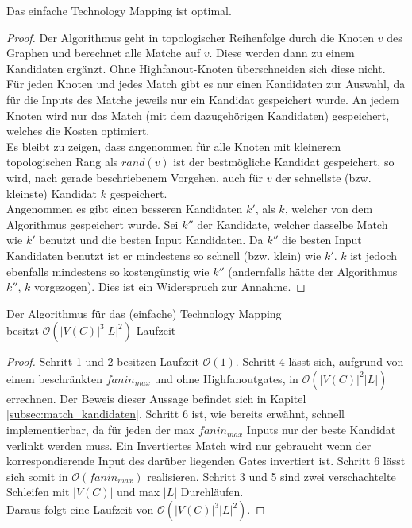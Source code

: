 \documentclass[11pt, a4paper, german]{article}
\newcommand{\TM}{Technology Mapping }
\begin{document}
\begin{cor}
	Das einfache \TM  ist optimal. 
\end{cor}
\begin{proof}
	Der Algorithmus geht in topologischer Reihenfolge durch die Knoten $v$ des Graphen und berechnet alle Matche auf $v$. Diese werden dann zu einem Kandidaten ergänzt. 
 Ohne Highfanout-Knoten überschneiden sich diese nicht. Für jeden Knoten und jedes Match gibt es nur einen Kandidaten zur Auswahl, da für die Inputs des Matche jeweils nur ein Kandidat gespeichert wurde. An jedem Knoten wird nur das Match (mit dem dazugehörigen Kandidaten) gespeichert, welches die Kosten optimiert. \\
 Es bleibt zu zeigen, dass angenommen für alle Knoten mit kleinerem topologischen Rang als $rand(v)$ ist der bestmögliche Kandidat gespeichert, so wird, nach gerade beschriebenem Vorgehen, auch für $v$ der schnellste (bzw. kleinste) Kandidat $k$ gespeichert. \\
 Angenommen es gibt einen besseren Kandidaten $k'$, als $k$, welcher von dem Algorithmus gespeichert wurde. Sei $k''$ der Kandidate, welcher dasselbe Match wie $k'$ benutzt und die besten Input Kandidaten. Da $k''$ die besten Input Kandidaten benutzt ist er mindestens so schnell (bzw. klein) wie $k'$. $k$ ist jedoch ebenfalls mindestens so kostengünstig wie $k''$ (andernfalls hätte der Algorithmus $k''$, $k$ vorgezogen). Dies ist ein Widerspruch zur Annahme. 
\end{proof}
 
\begin{cor}{Der Algorithmus für das (einfache) \TM  \\ besitzt $\mathcal{O}(  |V(C)|^3|L|^2)$-Laufzeit}
\end{cor}
\begin{proof}
Schritt 1 und 2 besitzen Laufzeit $\mathcal{O}(1)$. Schritt 4 lässt sich, aufgrund von einem beschränkten $fanin_{max}$ und ohne Highfanoutgates, in $\mathcal{O}(|V(C)|^2|L|)$ errechnen. Der Beweis dieser Aussage befindet sich in Kapitel \ref{subsec:match_kandidaten}. Schritt 6 ist, wie bereits erwähnt, schnell implementierbar, da für jeden der max $fanin_{max}$ Inputs nur der beste Kandidat verlinkt werden muss. Ein Invertiertes Match wird nur gebraucht wenn der korrespondierende Input des darüber liegenden Gates invertiert ist. Schritt 6 lässt sich somit in  $\mathcal{O}(fanin_{max})$ realisieren. Schritt 3 und 5 sind zwei verschachtelte Schleifen mit  $|V(C)|$ und max $|L|$ Durchläufen. \\
Daraus folgt eine Laufzeit von $\mathcal{O}(  |V(C)|^3|L|^2)$.
\end{proof}
\end{document}
